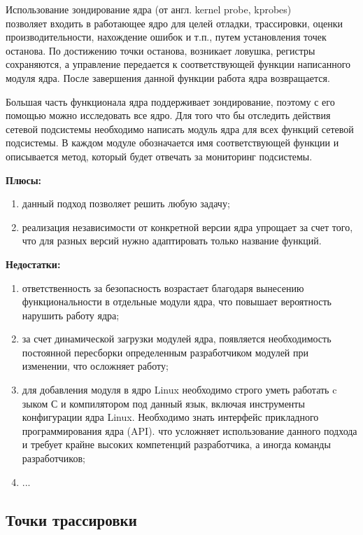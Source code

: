 Использование зондирование ядра (от англ. kernel probe, kprobes) \\ \cite{kernel_probes,kernel_probes_ibm} позволяет входить в работающее ядро для целей отладки, трассировки, оценки производительности, нахождение ошибок и т.п., путем установления точек останова. 
По достижению точки останова, возникает ловушка, регистры сохраняются, а управление передается к соответствующей функции написанного модуля ядра.
После завершения данной функции работа ядра возвращается.  

Большая часть функционала ядра поддерживает зондирование, поэтому с его помощью можно исследовать все ядро. Для того что бы отследить действия сетевой подсистемы необходимо написать модуль ядра для всех функций сетевой подсистемы.
В каждом модуле обозначается имя соответствующей функции и описывается метод, который будет отвечать за мониторинг подсистемы.
  
\textbf{Плюсы:}
\begin{enumerate}
	\item данный подход позволяет решить любую задачу;
	\item реализация независимости от конкретной версии ядра упрощает за счет того, что для разных версий нужно адаптировать только название функций.
\end{enumerate}

\textbf{Недостатки:}
\begin{enumerate}
	\item ответственность за безопасность возрастает благодаря вынесению функциональности в отдельные модули ядра, что повышает вероятность нарушить работу ядра;
	\item за счет динамической загрузки модулей ядра, появляется необходимость постоянной пересборки определенным разработчиком модулей при изменении, что осложняет работу;
	\item для добавления модуля в ядро Linux необходимо строго уметь работать c зыком С и компилятором под данный язык, включая инструменты конфигурации ядра Linux. Необходимо знать интерфейс прикладного программирования ядра (API)\cite{api_kernel}. что усложняет использование данного подхода и требует крайне высоких компетенций разработчика, а иногда команды разработчиков;
	\item ...
\end{enumerate}

\subsection{Точки трассировки}

